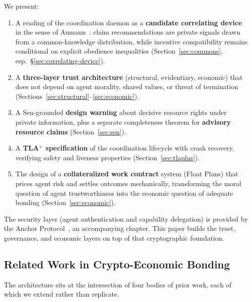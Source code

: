 \documentclass[11pt,a4paper]{article}
\theoremstyle{definition}
\theoremstyle{remark}
\begin{document}
We present:
\begin{enumerate}
  \item A reading of the coordination daemon as a \textbf{candidate correlating device} in the sense of Aumann~\cite{aumann1974subjectivity}: claim recommendations are private signals drawn from a common-knowledge distribution, while incentive compatibility remains conditional on explicit obedience inequalities (Section~\ref{sec:commons}, esp.\ \S\ref{sec:correlating-device}).
  \item A \textbf{three-layer trust architecture} (structural, evidentiary, economic) that does not depend on agent morality, shared values, or threat of termination (Sections~\ref{sec:structural}--\ref{sec:economic}).
  \item A Sen-grounded \textbf{design warning} about decisive resource rights under private information, plus a separate completeness theorem for \textbf{advisory resource claims} (Section~\ref{sec:sen}).
  \item A \textbf{TLA$^{+}$ specification} of the coordination lifecycle with crash recovery, verifying safety and liveness properties (Section~\ref{sec:tlaplus}).
  \item The design of a \textbf{collateralized work contract} system (Float Plans) that prices agent risk and settles outcomes mechanically, transforming the moral question of agent trustworthiness into the economic question of adequate bonding (Section~\ref{sec:economic}).
\end{enumerate}

The security layer (agent authentication and capability delegation) is provided by the Anchor Protocol~\cite{owens2026anchor}, an accompanying chapter. This paper builds the trust, governance, and economic layers on top of that cryptographic foundation.

\subsection{Related Work in Crypto-Economic Bonding}\label{sec:related-bonding}

The architecture sits at the intersection of four bodies of prior work, each of which we extend rather than replicate.
\end{document}
